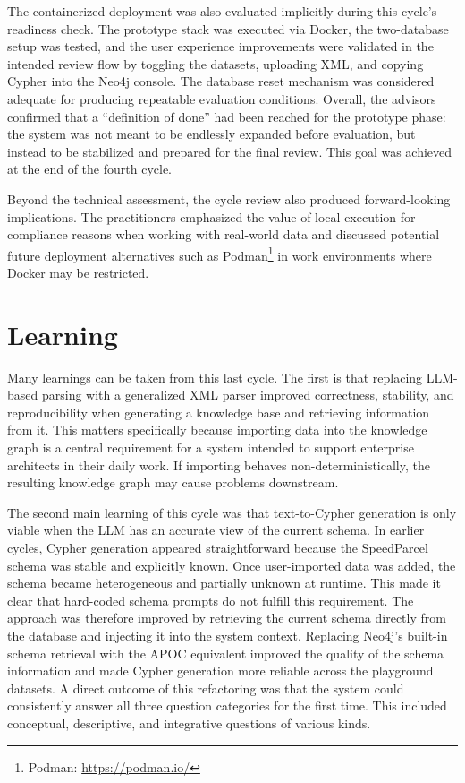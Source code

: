 The containerized deployment was also evaluated implicitly during this cycle’s readiness check. The prototype stack was executed via Docker, the two-database setup was tested, and the user experience improvements were validated in the intended review flow by toggling the datasets, uploading XML, and copying Cypher into the Neo4j console. The database reset mechanism was considered adequate for producing repeatable evaluation conditions. Overall, the advisors confirmed that a “definition of done” had been reached for the prototype phase: the system was not meant to be endlessly expanded before evaluation, but instead to be stabilized and prepared for the final review. This goal was achieved at the end of the fourth cycle.

Beyond the technical assessment, the cycle review also produced forward-looking implications. The practitioners emphasized the value of local execution for compliance reasons when working with real-world data and discussed potential future deployment alternatives such as Podman\footnote{Podman: \url{https://podman.io/}} in work environments where Docker may be restricted.

\section{Learning}
\label{sec:cycle4_learning}
Many learnings can be taken from this last cycle. The first is that replacing LLM-based parsing with a generalized XML parser improved correctness, stability, and reproducibility when generating a knowledge base and retrieving information from it. This matters specifically because importing data into the knowledge graph is a central requirement for a system intended to support enterprise architects in their daily work. If importing behaves non-deterministically, the resulting knowledge graph may cause problems downstream.

The second main learning of this cycle was that text-to-Cypher generation is only viable when the LLM has an accurate view of the current schema. In earlier cycles, Cypher generation appeared straightforward because the SpeedParcel schema was stable and explicitly known. Once user-imported data was added, the schema became heterogeneous and partially unknown at runtime. This made it clear that hard-coded schema prompts do not fulfill this requirement. The approach was therefore improved by retrieving the current schema directly from the database and injecting it into the system context. Replacing Neo4j’s built-in schema retrieval with the APOC equivalent improved the quality of the schema information and made Cypher generation more reliable across the playground datasets. A direct outcome of this refactoring was that the system could consistently answer all three question categories for the first time. This included conceptual, descriptive, and integrative questions of various kinds.


